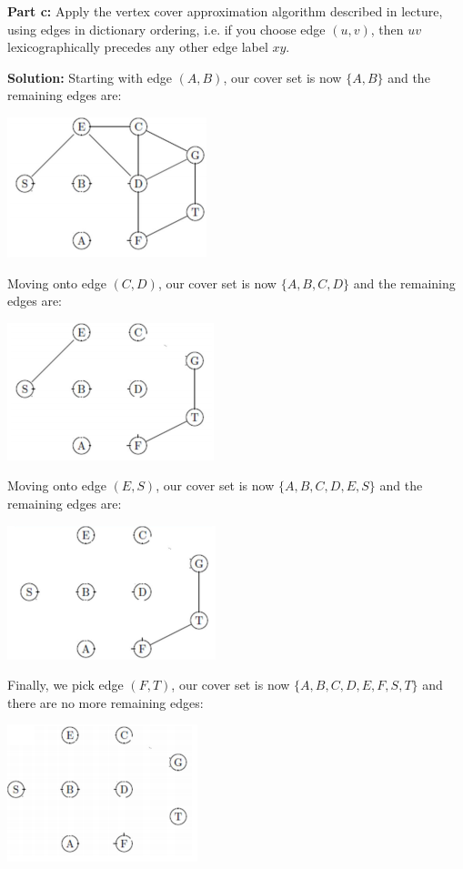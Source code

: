 \documentclass{article}
\begin{document}
\noindent\textbf{Part c:} Apply the vertex cover approximation algorithm described in lecture, using edges in dictionary ordering, i.e. if you choose edge $(u, v)$, then $uv$ lexicographically precedes any other edge label $xy$.
\bigskip

\noindent\textbf{Solution:} Starting with edge $(A,B)$, our cover set is now $\{A,B\}$ and the remaining edges are:
\begin{center}
  \includegraphics{graph8c-1.png}
\end{center}

Moving onto edge $(C,D)$, our cover set is now $\{A,B,C,D\}$ and the remaining edges are:
\begin{center}
  \includegraphics{graph8c-2.png}
\end{center}
\newpage

Moving onto edge $(E,S)$, our cover set is now $\{A,B,C,D,E,S\}$ and the remaining edges are:
\begin{center}
  \includegraphics{graph8c-3.png}
\end{center}

Finally, we pick edge $(F,T)$, our cover set is now $\{A,B,C,D,E,F,S,T\}$ and there are no more remaining edges:
\begin{center}
  \includegraphics{graph8c-4.png}
\end{center}
\end{document}
